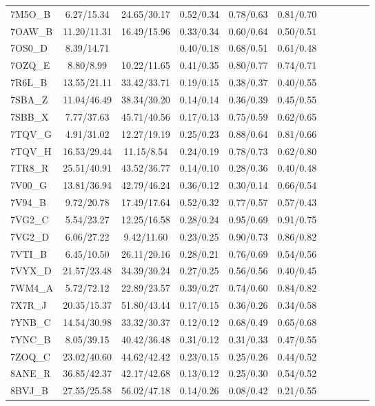 \begin{tabular}{lcccccccccc}
7M5O\_B & 6.27/15.34 & 24.65/30.17 & 0.52/0.34 & 0.78/0.63 & 0.81/0.70 \\
7OAW\_B & 11.20/11.31 & 16.49/15.96 & 0.33/0.34 & 0.60/0.64 & 0.50/0.51 \\
7OS0\_D & 8.39/14.71 &  & 0.40/0.18 & 0.68/0.51 & 0.61/0.48 \\
7OZQ\_E & 8.80/8.99 & 10.22/11.65 & 0.41/0.35 & 0.80/0.77 & 0.74/0.71 \\
7R6L\_B & 13.55/21.11 & 33.42/33.71 & 0.19/0.15 & 0.38/0.37 & 0.40/0.55 \\
7SBA\_Z & 11.04/46.49 & 38.34/30.20 & 0.14/0.14 & 0.36/0.39 & 0.45/0.55 \\
7SBB\_X & 7.77/37.63 & 45.71/40.56 & 0.17/0.13 & 0.75/0.59 & 0.62/0.65 \\
7TQV\_G & 4.91/31.02 & 12.27/19.19 & 0.25/0.23 & 0.88/0.64 & 0.81/0.66 \\
7TQV\_H & 16.53/29.44 & 11.15/8.54 & 0.24/0.19 & 0.78/0.73 & 0.62/0.80 \\
7TR8\_R & 25.51/40.91 & 43.52/36.77 & 0.14/0.10 & 0.28/0.36 & 0.40/0.48 \\
7V00\_G & 13.81/36.94 & 42.79/46.24 & 0.36/0.12 & 0.30/0.14 & 0.66/0.54 \\
7V94\_B & 9.72/20.78 & 17.49/17.64 & 0.52/0.32 & 0.77/0.57 & 0.57/0.43 \\
7VG2\_C & 5.54/23.27 & 12.25/16.58 & 0.28/0.24 & 0.95/0.69 & 0.91/0.75 \\
7VG2\_D & 6.06/27.22 & 9.42/11.60 & 0.23/0.25 & 0.90/0.73 & 0.86/0.82 \\
7VTI\_B & 6.45/10.50 & 26.11/20.16 & 0.28/0.21 & 0.76/0.69 & 0.54/0.56 \\
7VYX\_D & 21.57/23.48 & 34.39/30.24 & 0.27/0.25 & 0.56/0.56 & 0.40/0.45 \\
7WM4\_A & 5.72/72.12 & 22.89/23.57 & 0.39/0.27 & 0.74/0.60 & 0.84/0.82 \\
7X7R\_J & 20.35/15.37 & 51.80/43.44 & 0.17/0.15 & 0.36/0.26 & 0.34/0.58 \\
7YNB\_C & 14.54/30.98 & 33.32/30.37 & 0.12/0.12 & 0.68/0.49 & 0.65/0.68 \\
7YNC\_B & 8.05/39.15 & 40.42/36.48 & 0.31/0.12 & 0.31/0.33 & 0.47/0.55 \\
7ZOQ\_C & 23.02/40.60 & 44.62/42.42 & 0.23/0.15 & 0.25/0.26 & 0.44/0.52 \\
8ANE\_R & 36.85/42.37 & 42.17/42.68 & 0.13/0.12 & 0.25/0.30 & 0.54/0.52 \\
8BVJ\_B & 27.55/25.58 & 56.02/47.18 & 0.14/0.26 & 0.08/0.42 & 0.21/0.55 \\

\end{tabular}
